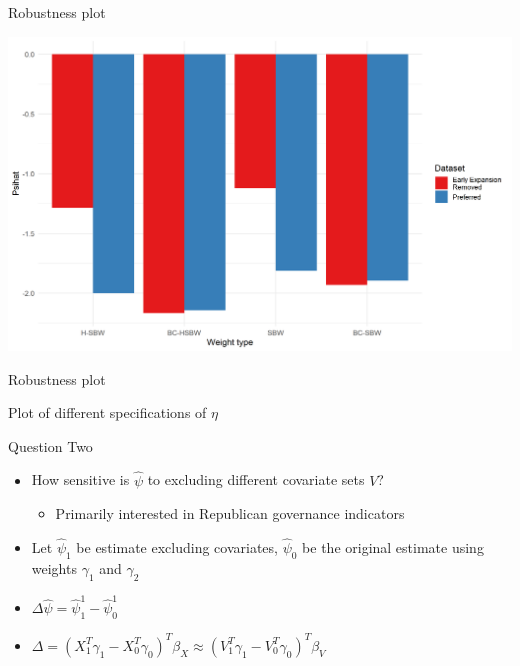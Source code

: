 \documentclass[hyperref={pdfpagelabels=false}]{beamer}
\begin{document}
\begin{frame}{Robustness plot}

\begin{center}
	\includegraphics[scale=0.5]{01_Plots/point-estimates-sigmai-c1c2-comparison.png}
\end{center}
\end{frame}

\begin{frame}{Robustness plot}

Plot of different specifications of $\eta$

\end{frame}


\begin{frame}{Question Two}
    \begin{itemize}
        \item How sensitive is $\hat{\psi}$ to excluding different covariate sets $V$? \bigskip 
        \begin{itemize}
            \item Primarily interested in Republican governance indicators \bigskip
        \end{itemize}
        \item Let $\hat{\psi}_1$ be estimate excluding covariates, $\hat{\psi}_0$ be the original estimate using weights $\gamma_1$ and $\gamma_2$ \bigskip
        \item $\Delta \hat{\psi} = \hat{\psi}^1_1 - \hat{\psi}^1_0$ \bigskip
        \item $\Delta = (X_1^T\gamma_1 - X_0^T\gamma_0)^T\beta_X \approx (V_1^T\gamma_1 - V_0^T\gamma_0)^T\beta_V$
    \end{itemize}
\end{frame}
\end{document}
